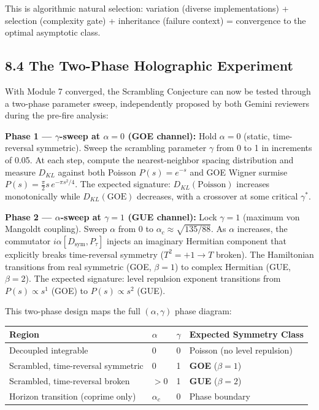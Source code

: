 \documentclass[
  11pt,
]{article}
\newcounter{none} %
\numberwithin{equation}{section}
\begin{document}
This is algorithmic natural selection: variation (diverse
implementations) + selection (complexity gate) + inheritance (failure
context) = convergence to the optimal asymptotic class.

\subsection{8.4 The Two-Phase Holographic
Experiment}\label{the-two-phase-holographic-experiment}

With Module 7 converged, the Scrambling Conjecture can now be tested
through a two-phase parameter sweep, independently proposed by both
Gemini reviewers during the pre-fire analysis:

\textbf{Phase 1 --- \(\gamma\)-sweep at \(\alpha = 0\) (GOE channel):}
Hold \(\alpha = 0\) (static, time-reversal symmetric). Sweep the
scrambling parameter \(\gamma\) from 0 to 1 in increments of 0.05. At
each step, compute the nearest-neighbor spacing distribution and measure
\(D_{KL}\) against both Poisson \(P(s) = e^{-s}\) and GOE Wigner surmise
\(P(s) = \frac{\pi}{2} s \, e^{-\pi s^2/4}\). The expected signature:
\(D_{KL}(\text{Poisson})\) increases monotonically while
\(D_{KL}(\text{GOE})\) decreases, with a crossover at some critical
\(\gamma^*\).

\textbf{Phase 2 --- \(\alpha\)-sweep at \(\gamma = 1\) (GUE channel):}
Lock \(\gamma = 1\) (maximum von Mangoldt coupling). Sweep \(\alpha\)
from 0 to \(\alpha_c \approx \sqrt{135/88}\). As \(\alpha\) increases,
the commutator \(i\alpha[D_{\text{sym}}, P_\tau]\) injects an imaginary
Hermitian component that explicitly breaks time-reversal symmetry
(\(T^2 = +1 \to T\) broken). The Hamiltonian transitions from real
symmetric (GOE, \(\beta = 1\)) to complex Hermitian (GUE,
\(\beta = 2\)). The expected signature: level repulsion exponent
transitions from \(P(s) \propto s^1\) (GOE) to \(P(s) \propto s^2\)
(GUE).

This two-phase design maps the full \((\alpha, \gamma)\) phase diagram:

{\def\LTcaptype{none} %
\begin{longtable}[]{@{}llll@{}}
\toprule\noalign{}
Region & \(\alpha\) & \(\gamma\) & Expected Symmetry Class \\
\midrule\noalign{}
\endhead
\bottomrule\noalign{}
\endlastfoot
Decoupled integrable & 0 & 0 & Poisson (no level repulsion) \\
Scrambled, time-reversal symmetric & 0 & 1 & \textbf{GOE}
(\(\beta = 1\)) \\
Scrambled, time-reversal broken & \(> 0\) & 1 & \textbf{GUE}
(\(\beta = 2\)) \\
Horizon transition (coprime only) & \(\alpha_c\) & 0 & Phase boundary \\
\end{longtable}
}
\end{document}
